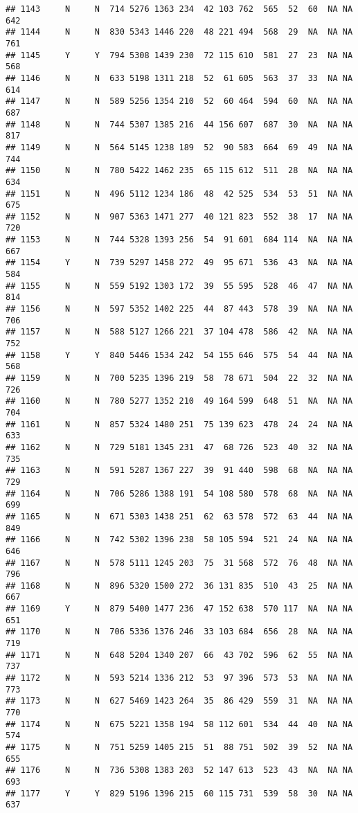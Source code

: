\documentclass[]{article}
\begin{document}
\begin{verbatim}
## 1143     N     N  714 5276 1363 234  42 103 762  565  52  60  NA NA  642
## 1144     N     N  830 5343 1446 220  48 221 494  568  29  NA  NA NA  761
## 1145     Y     Y  794 5308 1439 230  72 115 610  581  27  23  NA NA  568
## 1146     N     N  633 5198 1311 218  52  61 605  563  37  33  NA NA  614
## 1147     N     N  589 5256 1354 210  52  60 464  594  60  NA  NA NA  687
## 1148     N     N  744 5307 1385 216  44 156 607  687  30  NA  NA NA  817
## 1149     N     N  564 5145 1238 189  52  90 583  664  69  49  NA NA  744
## 1150     N     N  780 5422 1462 235  65 115 612  511  28  NA  NA NA  634
## 1151     N     N  496 5112 1234 186  48  42 525  534  53  51  NA NA  675
## 1152     N     N  907 5363 1471 277  40 121 823  552  38  17  NA NA  720
## 1153     N     N  744 5328 1393 256  54  91 601  684 114  NA  NA NA  667
## 1154     Y     N  739 5297 1458 272  49  95 671  536  43  NA  NA NA  584
## 1155     N     N  559 5192 1303 172  39  55 595  528  46  47  NA NA  814
## 1156     N     N  597 5352 1402 225  44  87 443  578  39  NA  NA NA  706
## 1157     N     N  588 5127 1266 221  37 104 478  586  42  NA  NA NA  752
## 1158     Y     Y  840 5446 1534 242  54 155 646  575  54  44  NA NA  568
## 1159     N     N  700 5235 1396 219  58  78 671  504  22  32  NA NA  726
## 1160     N     N  780 5277 1352 210  49 164 599  648  51  NA  NA NA  704
## 1161     N     N  857 5324 1480 251  75 139 623  478  24  24  NA NA  633
## 1162     N     N  729 5181 1345 231  47  68 726  523  40  32  NA NA  735
## 1163     N     N  591 5287 1367 227  39  91 440  598  68  NA  NA NA  729
## 1164     N     N  706 5286 1388 191  54 108 580  578  68  NA  NA NA  699
## 1165     N     N  671 5303 1438 251  62  63 578  572  63  44  NA NA  849
## 1166     N     N  742 5302 1396 238  58 105 594  521  24  NA  NA NA  646
## 1167     N     N  578 5111 1245 203  75  31 568  572  76  48  NA NA  796
## 1168     N     N  896 5320 1500 272  36 131 835  510  43  25  NA NA  667
## 1169     Y     N  879 5400 1477 236  47 152 638  570 117  NA  NA NA  651
## 1170     N     N  706 5336 1376 246  33 103 684  656  28  NA  NA NA  719
## 1171     N     N  648 5204 1340 207  66  43 702  596  62  55  NA NA  737
## 1172     N     N  593 5214 1336 212  53  97 396  573  53  NA  NA NA  773
## 1173     N     N  627 5469 1423 264  35  86 429  559  31  NA  NA NA  770
## 1174     N     N  675 5221 1358 194  58 112 601  534  44  40  NA NA  574
## 1175     N     N  751 5259 1405 215  51  88 751  502  39  52  NA NA  655
## 1176     N     N  736 5308 1383 203  52 147 613  523  43  NA  NA NA  693
## 1177     Y     Y  829 5196 1396 215  60 115 731  539  58  30  NA NA  637

\end{verbatim}
\end{document}
